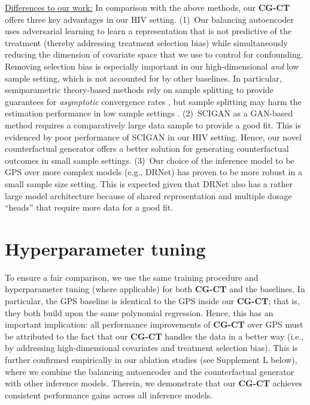\documentclass[sigconf]{acmart}
\newcommand{\framework}{\textbf{\mbox{CG-CT}}\xspace}
\begin{document}
\vspace{0.25cm}
\noindent
\underline{Differences to our work:} In comparison with the above methods, our \framework offers three key advantages in our HIV setting. (1)~Our balancing autoencoder uses adversarial learning to learn a representation that is not predictive of the treatment (thereby addressing treatment selection bias) while simultaneously reducing the dimension of covariate space that we use to control for confounding. Removing selection bias is especially important in our high-dimensional \emph{and} low sample setting, which is not accounted for by other baselines. In particular, semiparametric theory-based methods rely on sample splitting to provide guarantees for \emph{asymptotic} convergence rates \cite{Chernozhukov.2018, Foster.2019}, but sample splitting may harm the estimation performance in low sample settings \cite{Curth.2021}. (2)~SCIGAN as a GAN-based method requires a comparatively large data sample to provide a good fit. This is evidenced by poor performance of SCIGAN in our HIV setting. Hence, our novel counterfactual generator offers a better solution for generating counterfactual outcomes in small sample settings. (3)~Our choice of the inference model to be GPS over more complex models (e.g., DRNet) has proven to be more robust in a small sample size setting. This is expected given that DRNet also has a rather large model architecture because of shared representation and multiple dosage ``heads'' that require more data for a good fit. 

\section{Hyperparameter tuning}
\label{supp:hyperpars} %

To ensure a fair comparison, we use the same training procedure and hyperparameter tuning (where applicable) for both \framework and the baselines. In particular, the GPS baseline is identical to the GPS inside our \framework; that is, they both build upon the same polynomial regression. Hence, this has an important implication: all performance improvements of \framework over GPS must be attributed to the fact that our \framework handles the data in a better way (i.e., by addressing high-dimensional covariates and treatment selection bias). This is further confirmed empirically in our ablation studies (see Supplement L below), where we combine the balancing autoencoder and the counterfactual generator with other inference models. Therein, we demonstrate that our \framework achieves consistent performance gains across all inference models.
\end{document}
